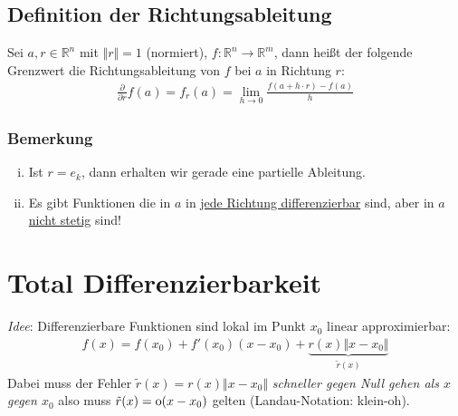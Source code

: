 \documentclass[11pt,a4paper]{book}
\newcommand {\Rn}	{\mathbb{R}^n}
\newcommand {\Rm}	{\mathbb{R}^m}
\newcommand{\1}    	{\mathbbm{1}}
\begin{document}
\subsection{Definition der Richtungsableitung}
Sei \(a, r \in \Rn\) mit \(\Vert r \Vert = 1\) (normiert), \(f: \Rn \rightarrow \Rm\), dann heißt der folgende Grenzwert die Richtungsableitung von \(f\) bei \(a\) in Richtung \(r\):
\begin{align*}
	\frac{\partial}{\partial r} f(a) = f_r (a) = \lim_{h \rightarrow 0} \frac{f(a + h \cdot r) - f(a)}{h}
\end{align*}

\subsubsection*{Bemerkung}
\begin{enumerate}[(i)]
	\item Ist \(r = e_k\), dann erhalten wir gerade eine partielle Ableitung.
	\item Es gibt Funktionen die in \(a\) in \underline{jede Richtung differenzierbar} sind, aber in \(a\) \underline{nicht stetig} sind!
\end{enumerate}

\section{Total Differenzierbarkeit}
\textit{Idee}: Differenzierbare Funktionen sind lokal im Punkt \(x_0\) linear approximierbar:
\begin{align*}
	f(x) = f(x_0) + f'(x_0)(x-x_0) + \underbrace{r(x)\Vert x-x_0 \Vert}_{\tilde{r}(x)}
\end{align*}
Dabei muss der Fehler \(\tilde{r}(x) = r(x)\Vert x - x_0 \Vert \) \textit{schneller gegen Null gehen als \(x\) gegen \(x_0\)} also muss \(\tilde{r}(x) = \hbox{o}(x - x_0)\) gelten (Landau-Notation: klein-oh).
\end{document}
